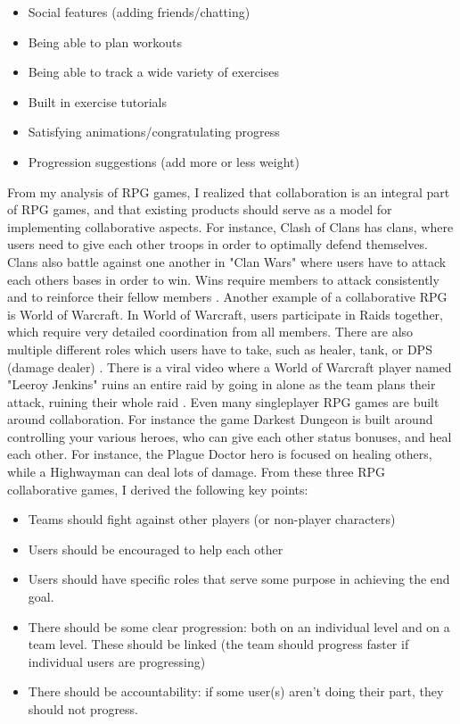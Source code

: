 \documentclass{l4proj}
\begin{document}
\begin{itemize}    
    \item
      Social features (adding friends/chatting)
    \item
      Being able to plan workouts
    \item
      Being able to track a wide variety of exercises
    \item 
      Built in exercise tutorials
    \item
      Satisfying animations/congratulating progress
    \item
      Progression suggestions (add more or less weight)
\end{itemize}

From my analysis of RPG games, I realized that collaboration is an integral part of RPG games, and that existing products should serve as a model for implementing collaborative aspects. For instance, Clash of Clans has clans, where users need to give each other troops in order to optimally defend themselves. Clans also battle against one another in "Clan Wars" where users have to attack each others bases in order to win. Wins require members to attack consistently and to reinforce their fellow members \citep{coc}. 
Another example of a collaborative RPG is World of Warcraft. In World of Warcraft, users participate in Raids together, which require very detailed coordination from all members. There are also multiple different roles which users have to take, such as healer, tank, or DPS (damage dealer) \citep{wow}. There is a viral video where a World of Warcraft player named "Leeroy Jenkins" ruins an entire raid by going in alone as the team plans their attack, ruining their whole raid \citep{leeroy_jenkins}. Even many singleplayer RPG games are built around collaboration. For instance the game Darkest Dungeon \citet{darkest_dungeon} is built around controlling your various heroes, who can give each other status bonuses, and heal each other. For instance, the Plague Doctor hero is focused on healing others, while a Highwayman can deal lots of damage. From these three RPG collaborative games, I derived the following key points:

\begin{itemize}    
    \item
      Teams should fight against other players (or non-player characters)
    \item
      Users should be encouraged to help each other
    \item
      Users should have specific roles that serve some purpose in achieving the end goal.
    \item 
      There should be some clear progression: both on an individual level and on a team level. These should be linked (the team should progress faster if individual users are progressing)
    \item 
      There should be accountability: if some user(s) aren't doing their part, they should not progress.
\end{itemize}
\end{document}
